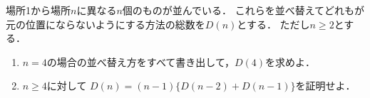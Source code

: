 \documentclass[../../main.tex]{subfiles}
\begin{document}
場所1から場所$n$に異なる$n$個のものが並んでいる．
これらを並べ替えてどれもが元の位置にならないようにする方法の総数を$D(n)$とする．
ただし$n \ge 2$とする．

\begin{enumerate}
  \item $n=4$の場合の並べ替え方をすべて書き出して，$D(4)$を求めよ．
  \item $n \ge 4$に対して $D(n)=(n-1)\{D(n-2)+D(n-1)\}$を証明せよ．
\end{enumerate}
\end{document}
